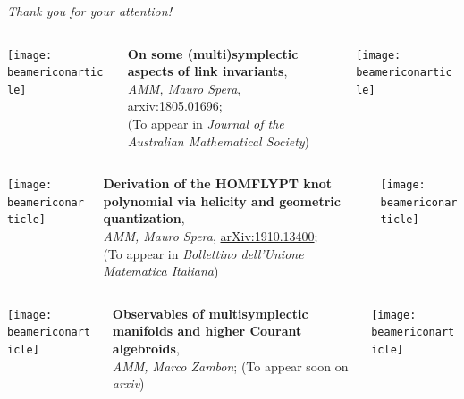 \documentclass[handout,10pt]{beamer}
\begin{document}
	\begin{frame}{}
		\vfill
	  \centering 
	  {\Huge\color{red} 
	  \emph{Thank you for your attention!}}
		\vfill
		\centering
		\begin{columns}
			\hfill
			\begin{column}{0.05\linewidth}
				\centering \texttt{[image: beamericonarticle]}
			\end{column}
			\begin{column}{0.8\linewidth}
				\centering
				\textbf{On some (multi)symplectic aspects of link invariants},
				\\
				\emph{AMM, Mauro Spera}, \href{https://arXiv.org/abs/1805.01696}{arxiv:1805.01696};\\
				(To appear in \emph{Journal of the Australian Mathematical Society})	
			\end{column}
			\begin{column}{0.05\linewidth}
				\centering \texttt{[image: beamericonarticle]}			
			\end{column}
			\hfill
		\end{columns}
		\vfill
		\begin{columns}
			\hfill
			\begin{column}{0.05\linewidth}
				\centering \texttt{[image: beamericonarticle]}
			\end{column}
			\begin{column}{0.8\linewidth}
				\centering
		\textbf{Derivation of the HOMFLYPT knot polynomial via helicity and geometric quantization},
				\\
		\emph{AMM, Mauro Spera}, \href{https://arxiv.org/abs/1910.13400}{arXiv:1910.13400};\\
				(To appear in \emph{Bollettino dell'Unione Matematica Italiana})	
			\end{column}				
			\begin{column}{0.05\linewidth}
				\centering \texttt{[image: beamericonarticle]}			
			\end{column}
			\hfill
		\end{columns}
		\vfill
		\begin{columns}
			\hfill
			\begin{column}{0.05\linewidth}
				\centering \texttt{[image: beamericonarticle]}
			\end{column}
			\begin{column}{0.8\linewidth}
				\centering
				\textbf{Observables of multisymplectic manifolds and higher Courant algebroids},
				\\
				\emph{AMM, Marco Zambon};%
				(To appear soon on \emph{arxiv})	
			\end{column}
			\begin{column}{0.05\linewidth}
				\centering \texttt{[image: beamericonarticle]}			
			\end{column}
			\hfill
		\end{columns}
	\end{frame}
\end{document}
